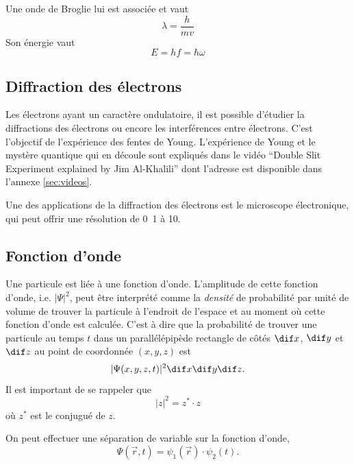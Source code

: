 Une onde de Broglie lui est associée et vaut
\[ \lambda = \frac{h}{mv} \]
Son énergie vaut
\[ E = hf = \hbar \omega \]

\subsection{Diffraction des électrons}
Les électrons ayant un caractère ondulatoire, il
est possible d'étudier la diffractions des électrons
ou encore les interférences entre électrons. C'est l'objectif
de l'expérience des fentes de Young. L'expérience de
Young et le mystère quantique qui en découle sont
expliqués dans le vidéo ``Double Slit Experiment explained
by Jim Al-Khalili'' dont l'adresse est disponible dans
l'annexe \ref{sec:videos}.

Une des applications de la diffraction des électrons est
le microscope électronique, qui peut offrir une résolution
de \unit{0.1}{\nano\meter} à \unit{10}{\nano\meter}.

\subsection{Fonction d'onde}
Une particule est liée à une fonction d'onde.
L'amplitude de cette fonction d'onde, i.e. $|\Psi|^2$, peut être interprété
comme la \emph{densité} de probabilité par unité de volume de trouver
la particule à l'endroit de l'espace et au moment où cette fonction
d'onde est calculée.
C'est à dire que la probabilité de trouver une particule
au temps $t$ dans un parallélépipède rectangle de côtés
$\dif x$, $\dif y$ et $\dif z$ au point de coordonnée $(x, y, z)$ est
\[ |\Psi(x, y, z, t)|^2 \dif x \dif y \dif z .\]
Il est important de se rappeler que
\[ |z|^2 = z^{*} \cdot z \]
où $z^{*}$ est le conjugué de $z$.

On peut effectuer une séparation de variable sur la fonction d'onde,
\[ \Psi(\vec{r}, t) = \psi_1(\vec{r}) \cdot \psi_2(t). \]

